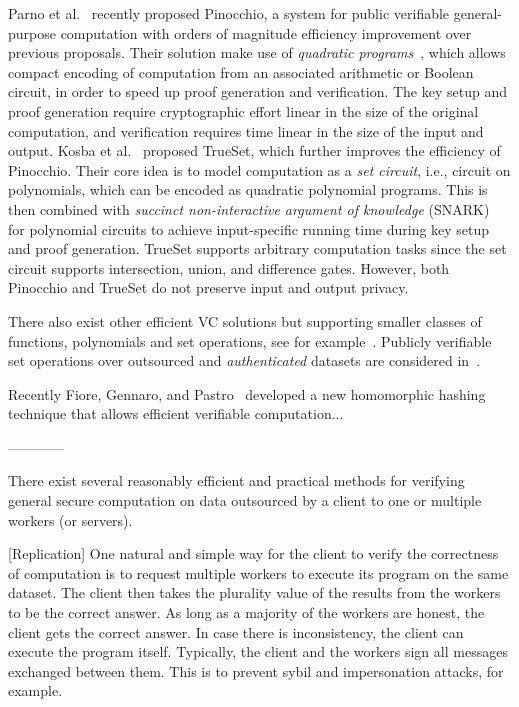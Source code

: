 Parno et al.~\cite{PHG+13} recently proposed Pinocchio, a system for public verifiable general-purpose computation with orders of magnitude efficiency improvement over previous proposals.
Their solution make use of {\em quadratic programs}~\cite{GGP+13}, which allows compact encoding of computation from an associated arithmetic or Boolean circuit, in order to speed up proof generation and verification.
The key setup and proof generation require cryptographic effort linear in the size of the original computation, and verification requires time linear in the size of the input and output.
Kosba et al.~\cite{KPP+14} proposed {\sc TrueSet}, which further improves the efficiency of Pinocchio.
Their core idea is to model computation as a {\em set circuit}, i.e., circuit on polynomials, which can be encoded as quadratic polynomial programs.
This is then combined with {\em succinct non-interactive argument of knowledge} (SNARK)~\cite{GGP+13} for polynomial circuits to achieve input-specific running time during key setup and proof generation.
{\sc TrueSet} supports arbitrary computation tasks since the set circuit supports intersection, union, and difference gates.
However, both Pinocchio and {\sc TrueSet} do not preserve input and output privacy.

There also exist other efficient VC solutions but supporting smaller classes of functions, polynomials and set operations, see for example~\cite{BGV11,PTT11,FG12}.
Publicly verifiable set operations over outsourced and {\em authenticated} datasets are considered in~\cite{CPP+14}.

Recently Fiore, Gennaro, and Pastro~\cite{FGP14} developed a new homomorphic hashing technique that allows efficient verifiable computation...

------------

There exist several reasonably efficient and practical methods for verifying general secure computation on data outsourced by a client to one or multiple workers (or servers).

[Replication]
One natural and simple way for the client to verify the correctness of computation is to request multiple workers to execute its program on the same dataset. The client then takes the plurality value of the results from the workers to be the correct answer. As long as a majority of the workers are honest, the client gets the correct answer. In case there is inconsistency, the client can execute the program itself. Typically, the client and the workers sign all messages exchanged between them. This is to prevent sybil and impersonation attacks, for example.

